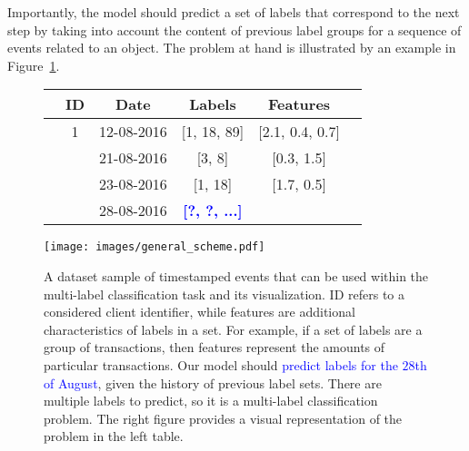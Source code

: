 \documentclass[runningheads]{llncs}
\begin{document}
Importantly, the model should predict a set of labels that correspond to the next step by taking into account the content of previous label groups for a sequence of events related to an object.
The problem at hand is illustrated by an example in Figure~\ref{fig:multi_label_data}.


\begin{figure}[h!]
\begin{minipage}{0.47\linewidth}
\centering
\begin{tabular}{cccccc}
\hline
& ID & Date & Labels & Features\\
\hline
& 1 & 12-08-2016 & [1, 18, 89] & [2.1, 0.4, 0.7] \\
& & 21-08-2016 & [3, 8] & [0.3, 1.5] \\
& & 23-08-2016 & [1, 18] & [1.7, 0.5] \\
& & 28-08-2016 & \textbf{\textcolor{blue}{[?, ?, ...]}} & \\
\hline
\end{tabular}
\end{minipage}
\begin{minipage}{0.53\linewidth}
\centering
\label{fig:general_scheme}
\texttt{[image: images/general\_scheme.pdf]}
\end{minipage}
\caption{A dataset sample of timestamped events that can be used within the multi-label classification task and its visualization. ID refers to a considered client identifier, while features are additional characteristics of labels in a set. For example, if a set of labels are a group of transactions, then features represent the amounts of particular transactions. Our model should \textcolor{blue}{predict labels for the $28$th of August}, given the history of previous label sets. There are multiple labels to predict, so it is a multi-label classification problem. The right figure provides a visual representation of the problem in the left table.}
\label{fig:multi_label_data}
\end{figure}
\end{document}
